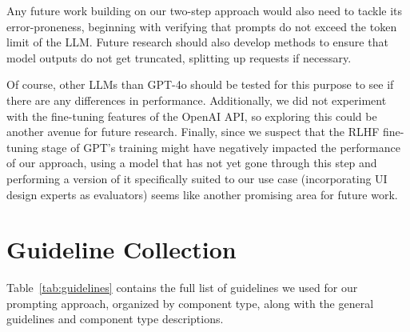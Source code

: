 \documentclass[11pt,titlepage,oneside,openany]{book}
\begin{document}
Any future work building on our two-step approach would also need to tackle its error-proneness, beginning with verifying that prompts do not exceed the token limit of the LLM. Future research should also develop methods to ensure that model outputs do not get truncated, splitting up requests if necessary.

Of course, other LLMs than GPT-4o should be tested for this purpose to see if there are any differences in performance. Additionally, we did not experiment with the fine-tuning features of the OpenAI API, so exploring this could be another avenue for future research. Finally, since we suspect that the RLHF fine-tuning stage of GPT's training might have negatively impacted the performance of our approach, using a model that has not yet gone through this step and performing a version of it specifically suited to our use case (incorporating UI design experts as evaluators) seems like another promising area for future work. 




\appendix

\chapter{Guideline Collection}
\label{cha:appendix-a}

Table~\ref{tab:guidelines} contains the full list of guidelines we used for our prompting approach, organized by component type, along with the general guidelines and component type descriptions.
\end{document}
